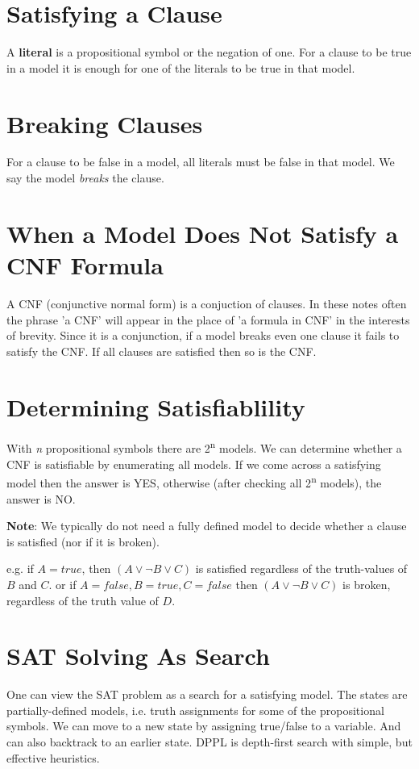 \documentclass[11pt]{article}
\begin{document}
\section{Satisfying a Clause}
\label{sec:org0691404}
A \textbf{literal} is a propositional symbol or the negation of one.
For a clause to be true in a model it is enough for one of the literals to be true in that model.

\section{Breaking Clauses}
\label{sec:org30da39f}
For a clause to be false in a model, all literals must be false in that model.
We say the model \emph{breaks} the clause.

\section{When a Model Does Not Satisfy a CNF Formula}
\label{sec:org207bb29}
A CNF (conjunctive normal form) is a conjuction of clauses.
In these notes often the phrase 'a CNF' will appear in the place of 'a formula in CNF' in the interests of brevity.
Since it is a conjunction, if a model breaks even one clause it fails to satisfy the CNF.
If all clauses are satisfied then so is the CNF.

\section{Determining Satisfiablility}
\label{sec:orgc4e5938}
With \emph{n} propositional symbols there are 2\textsuperscript{n} models.
We can determine whether a CNF is satisfiable by enumerating all models.
If we come across a satisfying model then the answer is YES, otherwise (after checking all 2\textsuperscript{n} models), the answer is NO.

\textbf{Note}: We typically do not need a fully defined model to decide whether a clause is satisfied (nor if it is broken).

e.g. if \(A = true\), then \((A \lor \neg B \lor C)\) is satisfied regardless of the truth-values of \(B\) and \(C\).
or if \(A = false, B = true, C = false\) then \((A \lor \neg B \lor C)\) is broken, regardless of the truth value of \(D\).

\section{SAT Solving As Search}
\label{sec:org17630c7}
One can view the SAT problem as a search for a satisfying model.
The states are partially-defined models, i.e. truth assignments for some of the propositional symbols.
We can move to a new state by assigning true/false to a variable.
And can also backtrack to an earlier state.
DPPL is depth-first search with simple, but effective heuristics.
\end{document}
